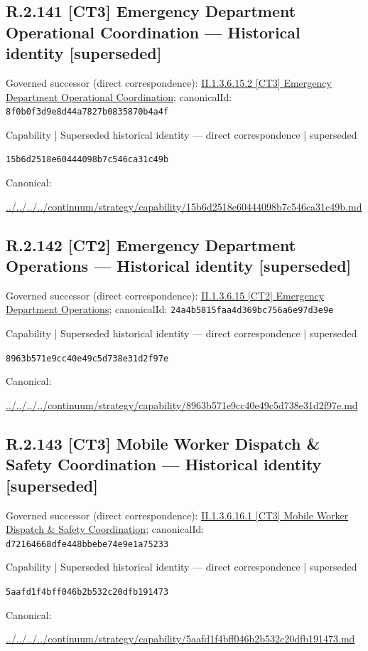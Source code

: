 \documentclass[10pt,a4paper]{article}
\begin{document}
\subsection*{R.2.141 [CT3] Emergency Department Operational Coordination — Historical identity [superseded]}
Governed successor (direct correspondence): \hyperref[element-8f0b0f3d9e8d44a7827b0835870b4a4f]{II.1.3.6.15.2 [CT3] Emergency Department Operational Coordination}; canonicalId: \texttt{8f0b0f3d9e8d44a7827b0835870b4a4f}\par
\label{element-15b6d2518e60444098b7c546ca31c49b}
{\small Capability | Superseded historical identity — direct correspondence | superseded}\par
\texttt{15b6d2518e60444098b7c546ca31c49b}\par
Canonical: \par
{\footnotesize\url{../../../../continuum/strategy/capability/15b6d2518e60444098b7c546ca31c49b.md}}\par
\subsection*{R.2.142 [CT2] Emergency Department Operations — Historical identity [superseded]}
Governed successor (direct correspondence): \hyperref[element-24a4b5815faa4d369bc756a6e97d3e9e]{II.1.3.6.15 [CT2] Emergency Department Operations}; canonicalId: \texttt{24a4b5815faa4d369bc756a6e97d3e9e}\par
\label{element-8963b571e9cc40e49c5d738e31d2f97e}
{\small Capability | Superseded historical identity — direct correspondence | superseded}\par
\texttt{8963b571e9cc40e49c5d738e31d2f97e}\par
Canonical: \par
{\footnotesize\url{../../../../continuum/strategy/capability/8963b571e9cc40e49c5d738e31d2f97e.md}}\par
\subsection*{R.2.143 [CT3] Mobile Worker Dispatch \& Safety Coordination — Historical identity [superseded]}
Governed successor (direct correspondence): \hyperref[element-d72164668dfe448bbebe74e9e1a75233]{II.1.3.6.16.1 [CT3] Mobile Worker Dispatch \& Safety Coordination}; canonicalId: \texttt{d72164668dfe448bbebe74e9e1a75233}\par
\label{element-5aafd1f4bff046b2b532c20dfb191473}
{\small Capability | Superseded historical identity — direct correspondence | superseded}\par
\texttt{5aafd1f4bff046b2b532c20dfb191473}\par
Canonical: \par
{\footnotesize\url{../../../../continuum/strategy/capability/5aafd1f4bff046b2b532c20dfb191473.md}}\par
\end{document}

